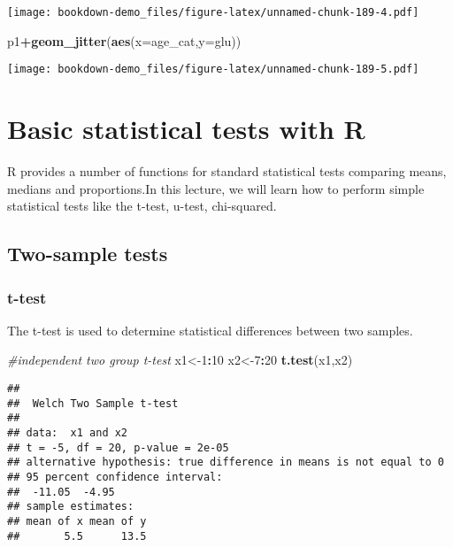\documentclass[]{book}
\newenvironment{Shaded}{\begin{snugshade}}{\end{snugshade}}
\newcommand{\KeywordTok}[1]{\textcolor[rgb]{0.13,0.29,0.53}{\textbf{#1}}}
\newcommand{\DataTypeTok}[1]{\textcolor[rgb]{0.13,0.29,0.53}{#1}}
\newcommand{\DecValTok}[1]{\textcolor[rgb]{0.00,0.00,0.81}{#1}}
\newcommand{\CommentTok}[1]{\textcolor[rgb]{0.56,0.35,0.01}{\textit{#1}}}
\newcommand{\OperatorTok}[1]{\textcolor[rgb]{0.81,0.36,0.00}{\textbf{#1}}}
\newcommand{\NormalTok}[1]{#1}
\theoremstyle{definition}
\theoremstyle{definition}
\theoremstyle{definition}
\theoremstyle{remark}
\begin{document}
\texttt{[image: bookdown-demo\_files/figure-latex/unnamed-chunk-189-4.pdf]}

\begin{Shaded}
\begin{Highlighting}[]
\NormalTok{p1}\OperatorTok{+}\KeywordTok{geom_jitter}\NormalTok{(}\KeywordTok{aes}\NormalTok{(}\DataTypeTok{x=}\NormalTok{age_cat,}\DataTypeTok{y=}\NormalTok{glu))}
\end{Highlighting}
\end{Shaded}

\texttt{[image: bookdown-demo\_files/figure-latex/unnamed-chunk-189-5.pdf]}

\chapter{Basic statistical tests with
R}\label{basic-statistical-tests-with-r}

R provides a number of functions for standard statistical tests
comparing means, medians and proportions.In this lecture, we will learn
how to perform simple statistical tests like the t-test, u-test,
chi-squared.

\section{Two-sample tests}\label{two-sample-tests}

\subsection{t-test}\label{t-test}

The t-test is used to determine statistical differences between two
samples.

\begin{Shaded}
\begin{Highlighting}[]
\CommentTok{#independent two group t-test}
\NormalTok{x1<-}\DecValTok{1}\OperatorTok{:}\DecValTok{10}
\NormalTok{x2<-}\DecValTok{7}\OperatorTok{:}\DecValTok{20}
\KeywordTok{t.test}\NormalTok{(x1,x2)}
\end{Highlighting}
\end{Shaded}

\begin{verbatim}
## 
##  Welch Two Sample t-test
## 
## data:  x1 and x2
## t = -5, df = 20, p-value = 2e-05
## alternative hypothesis: true difference in means is not equal to 0
## 95 percent confidence interval:
##  -11.05  -4.95
## sample estimates:
## mean of x mean of y 
##       5.5      13.5
\end{verbatim}
\end{document}
